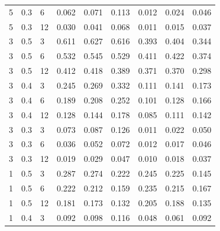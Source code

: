 \begin{refsection}
\begin{otherlanguage}{english}
\begin{scriptsize}
\begin{longtable}{lllllllll}
\cellcolor[HTML]{C0C0C0}5 & \cellcolor[HTML]{C0C0C0}0.3 & \cellcolor[HTML]{C0C0C0}6 & 0.062 & 0.071 & 0.113 & 0.012 & 0.024 & 0.046 \\
\cellcolor[HTML]{C0C0C0}5 & \cellcolor[HTML]{C0C0C0}0.3 & \cellcolor[HTML]{C0C0C0}12 & 0.030 & 0.041 & 0.068 & 0.011 & 0.015 & 0.037 \\
\cellcolor[HTML]{C0C0C0}3 & \cellcolor[HTML]{C0C0C0}0.5 & \cellcolor[HTML]{C0C0C0}3 & 0.611 & 0.627 & 0.616 & 0.393 & 0.404 & 0.344 \\
\cellcolor[HTML]{C0C0C0}3 & \cellcolor[HTML]{C0C0C0}0.5 & \cellcolor[HTML]{C0C0C0}6 & 0.532 & 0.545 & 0.529 & 0.411 & 0.422 & 0.374 \\
\cellcolor[HTML]{C0C0C0}3 & \cellcolor[HTML]{C0C0C0}0.5 & \cellcolor[HTML]{C0C0C0}12 & 0.412 & 0.418 & 0.389 & 0.371 & 0.370 & 0.298 \\
\cellcolor[HTML]{C0C0C0}3 & \cellcolor[HTML]{C0C0C0}0.4 & \cellcolor[HTML]{C0C0C0}3 & 0.245 & 0.269 & 0.332 & 0.111 & 0.141 & 0.173 \\
\cellcolor[HTML]{C0C0C0}3 & \cellcolor[HTML]{C0C0C0}0.4 & \cellcolor[HTML]{C0C0C0}6 & 0.189 & 0.208 & 0.252 & 0.101 & 0.128 & 0.166 \\
\cellcolor[HTML]{C0C0C0}3 & \cellcolor[HTML]{C0C0C0}0.4 & \cellcolor[HTML]{C0C0C0}12 & 0.128 & 0.144 & 0.178 & 0.085 & 0.111 & 0.142 \\
\cellcolor[HTML]{C0C0C0}3 & \cellcolor[HTML]{C0C0C0}0.3 & \cellcolor[HTML]{C0C0C0}3 & 0.073 & 0.087 & 0.126 & 0.011 & 0.022 & 0.050 \\
\cellcolor[HTML]{C0C0C0}3 & \cellcolor[HTML]{C0C0C0}0.3 & \cellcolor[HTML]{C0C0C0}6 & 0.036 & 0.052 & 0.072 & 0.012 & 0.017 & 0.046 \\
\cellcolor[HTML]{C0C0C0}3 & \cellcolor[HTML]{C0C0C0}0.3 & \cellcolor[HTML]{C0C0C0}12 & 0.019 & 0.029 & 0.047 & 0.010 & 0.018 & 0.037 \\
\cellcolor[HTML]{C0C0C0}1 & \cellcolor[HTML]{C0C0C0}0.5 & \cellcolor[HTML]{C0C0C0}3 & 0.287 & 0.274 & 0.222 & 0.245 & 0.225 & 0.145 \\
\cellcolor[HTML]{C0C0C0}1 & \cellcolor[HTML]{C0C0C0}0.5 & \cellcolor[HTML]{C0C0C0}6 & 0.222 & 0.212 & 0.159 & 0.235 & 0.215 & 0.167 \\
\cellcolor[HTML]{C0C0C0}1 & \cellcolor[HTML]{C0C0C0}0.5 & \cellcolor[HTML]{C0C0C0}12 & 0.181 & 0.173 & 0.132 & 0.205 & 0.188 & 0.135 \\
\cellcolor[HTML]{C0C0C0}1 & \cellcolor[HTML]{C0C0C0}0.4 & \cellcolor[HTML]{C0C0C0}3 & 0.092 & 0.098 & 0.116 & 0.048 & 0.061 & 0.092 \\

\end{longtable}
\end{scriptsize}
\end{otherlanguage}
\end{refsection}
